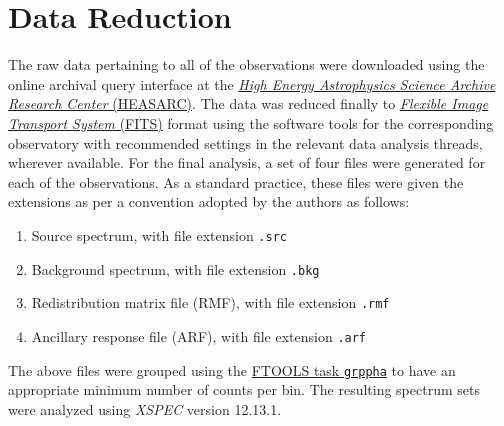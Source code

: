\section{Data Reduction} \label{sec:reduction-analysis}
    The raw data pertaining to all of the observations were downloaded using the online archival query interface at the %
    \href{https://heasarc.gsfc.nasa.gov/db-perl/W3Browse/w3browse.pl}{\textit{High Energy Astrophysics Science Archive Research Center} (HEASARC)}. The data was reduced finally to %
    \href{https://fits.gsfc.nasa.gov/standard40/fits_standard40aa-le.pdf}{\textit{Flexible Image Transport System} (FITS)} format using the software tools for the corresponding observatory with recommended settings in the relevant data analysis threads, wherever available. For the final analysis, a set of four files were generated for each of the observations. As a standard practice, these files were given the extensions as per a convention adopted by the authors as follows:
    \begin{enumerate}
    	\item Source spectrum, with file extension \texttt{.src}
    	\item Background spectrum, with file extension \texttt{.bkg}
    	\item Redistribution matrix file (RMF), with file extension \texttt{.rmf}
    	\item Ancillary response file (ARF), with file extension \texttt{.arf}
    \end{enumerate}
    The above files were grouped using the %
    \href{https://heasarc.gsfc.nasa.gov/docs/heasarc/caldb/docs/memos/cal_sw_93_010/cal_sw_93_010.pdf}{FTOOLS task \texttt{grppha}} to have an appropriate minimum number of counts per bin. The resulting spectrum sets were analyzed using \textit{XSPEC} version 12.13.1.
    
